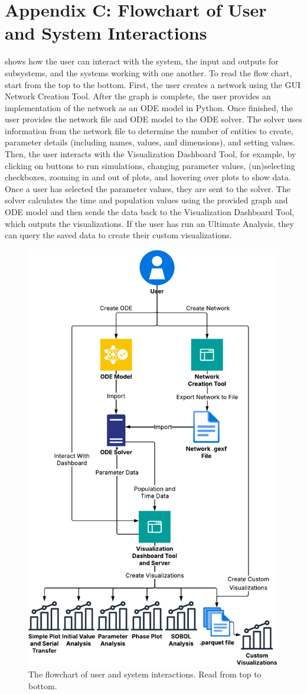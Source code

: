 \chapter{Appendix C: Flowchart of User and System Interactions}
\label{AppendixC}

 shows how the user can interact with the system, the input and outputs for subsystems, and the systems working with one another. 
 To read the flow chart, start from the top to the bottom. 
 First, the user creates a network using the GUI Network Creation Tool. 
 After the graph is complete, the user provides an implementation of the network as an ODE model in Python. 
 Once finished, the user provides the network file and ODE model to the ODE solver. 
 The solver uses information from the network file to determine the number of entities to create, parameter details (including names, values, and dimensions), and setting values.
 Then, the user interacts with the Visualization Dashboard Tool, for example, by clicking on buttons to run simulations, changing parameter values, (un)selecting checkboxes, zooming in and out of plots, and hovering over plots to show data. 
 Once a user has selected the parameter values, they are sent to the solver. 
 The solver calculates the time and population values using the provided graph and ODE model and then sends the data back to the Visualization Dashboard Tool, which outputs the visualizations. 
 If the user has run an Ultimate Analysis, they can query the saved data to create their custom visualizations.
\begin{figure}
    \centering
    \includegraphics[width=0.8\linewidth]{Images/interaction_diagram.pdf}
    \captionsetup{width=1\linewidth}
    \caption{
        The flowchart of user and system interactions. Read from top to bottom. 
    }
    \label{fig:interaction_diagram}
\end{figure} 